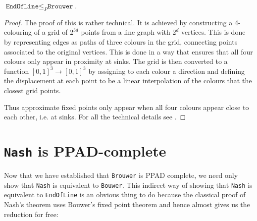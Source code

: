 \documentclass{article}
\begin{document}
\begin{theorem}
  $\texttt{EndOfLine}\leq_P\texttt{Brouwer}$.
  \begin{proof}
    The proof of this is rather technical. It is achieved by constructing
    a 4-colouring of a grid of $2^{3d}$ points from a line graph with
    $2^d$ vertices. This is done by representing edges as paths
    of three colours in the grid, connecting points associated to the
    original vertices. This is done in a way that ensures
    that all four colours only appear in proximity at sinks. The grid
    is then converted to a function $[0,1]^3\to[0,1]^3$ by assigning
    to each colour a direction and defining the displacement at each point to be a linear interpolation of the colours that the closest grid points.

    Thus approximate fixed points only appear when all four colours
    appear close to each other, i.e. at sinks. For all the technical
    details see \cite{daskalakis2008}.
  \end{proof}
\end{theorem}


\section{\texttt{Nash} is PPAD-complete}

Now that we have established that \texttt{Brouwer} is PPAD complete,
we need only show that \texttt{Nash} is equivalent to \texttt{Bouwer}.
This indirect way of showing that \texttt{Nash} is equivalent to
\texttt{EndOfLine} is an obvious thing to do because the classical
proof of Nash's theorem uses Bouwer's fixed point theorem and hence
almost gives us the reduction for free:
\end{document}
